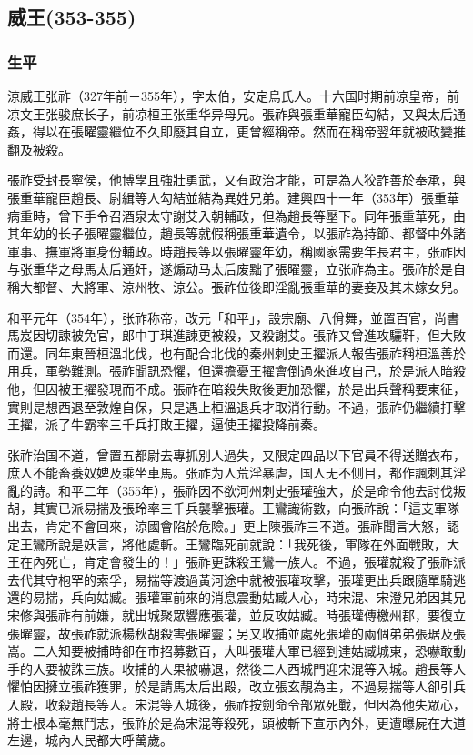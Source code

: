 
\subsection{威王\tiny(353-355)}

\subsubsection{生平}

涼威王张祚（327年前－355年），字太伯，安定烏氏人。十六国时期前凉皇帝，前凉文王张骏庶长子，前凉桓王张重华异母兄。張祚與張重華寵臣勾結，又與太后通姦，得以在張曜靈繼位不久即廢其自立，更曾經稱帝。然而在稱帝翌年就被政變推翻及被殺。

張祚受封長寧侯，他博學且強壯勇武，又有政治才能，可是為人狡詐善於奉承，與張重華寵臣趙長、尉緝等人勾結並結為異姓兄弟。建興四十一年（353年）張重華病重時，曾下手令召酒泉太守謝艾入朝輔政，但為趙長等壓下。同年張重華死，由其年幼的长子張曜靈繼位，趙長等就假稱張重華遺令，以張祚為持節、都督中外諸軍事、撫軍將軍身份輔政。時趙長等以張曜靈年幼，稱國家需要年長君主，张祚因与张重华之母馬太后通奸，遂煽动马太后废黜了張曜靈，立张祚為主。張祚於是自稱大都督、大將軍、涼州牧、涼公。張祚位後即淫亂張重華的妻妾及其未嫁女兒。

和平元年（354年），张祚称帝，改元「和平」，設宗廟、八佾舞，並置百官，尚書馬岌因切諫被免官，郎中丁琪進諫更被殺，又殺謝艾。張祚又曾進攻驪靬，但大敗而還。同年東晉桓溫北伐，也有配合北伐的秦州刺史王擢派人報告張祚稱桓溫善於用兵，軍勢難測。張祚聞訊恐懼，但還擔憂王擢會倒過來進攻自己，於是派人暗殺他，但因被王擢發現而不成。張祚在暗殺失敗後更加恐懼，於是出兵聲稱要東征，實則是想西退至敦煌自保，只是遇上桓溫退兵才取消行動。不過，張祚仍繼續打擊王擢，派了牛霸率三千兵打敗王擢，逼使王擢投降前秦。

张祚治国不道，曾置五都尉去專抓別人過失，又限定四品以下官員不得送贈衣布，庶人不能畜養奴婢及乘坐車馬。张祚为人荒淫暴虐，国人无不侧目，都作諷刺其淫亂的詩。和平二年（355年），張祚因不欲河州刺史張瓘強大，於是命令他去討伐叛胡，其實已派易揣及張玲率三千兵襲擊張瓘。王鸞識術數，向張祚說：「這支軍隊出去，肯定不會回來，涼國會陷於危險。」更上陳張祚三不道。張祚聞言大怒，認定王鸞所說是妖言，將他處斬。王鸞臨死前就說：「我死後，軍隊在外面戰敗，大王在內死亡，肯定會發生的！」張祚更誅殺王鸞一族人。不過，張瓘就殺了張祚派去代其守枹罕的索孚，易揣等渡過黃河途中就被張瓘攻擊，張瓘更出兵跟隨單騎逃還的易揣，兵向姑臧。張瓘軍前來的消息震動姑臧人心，時宋混、宋澄兄弟因其兄宋修與張祚有前嫌，就出城聚眾響應張瓘，並反攻姑臧。時張瓘傳檄州郡，要復立張曜靈，故張祚就派楊秋胡殺害張曜靈；另又收捕並處死張瓘的兩個弟弟張琚及張嵩。二人知要被捕時卻在市招募數百，大叫張瓘大軍已經到達姑臧城東，恐嚇敢動手的人要被誅三族。收捕的人果被嚇退，然後二人西城門迎宋混等入城。趙長等人懼怕因擁立張祚獲罪，於是請馬太后出殿，改立張玄靚為主，不過易揣等人卻引兵入殿，收殺趙長等人。宋混等入城後，張祚按劍命令部眾死戰，但因為他失眾心，將士根本毫無鬥志，張祚於是為宋混等殺死，頭被斬下宣示內外，更遭曝屍在大道左邊，城內人民都大呼萬歲。

